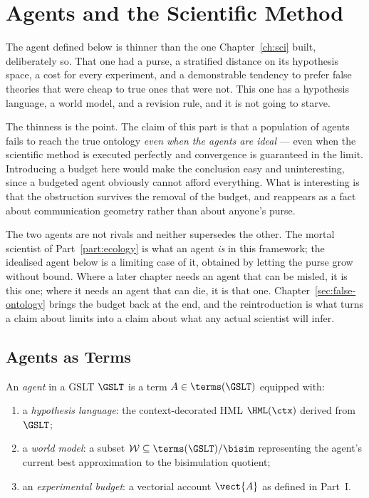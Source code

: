 \chapter{Agents and the Scientific Method}
\label{sec:agents}

The agent defined below is thinner than the one
Chapter~\ref{ch:sci} built, deliberately so.
That one had a purse, a stratified distance on its hypothesis space, a
cost for every experiment, and a demonstrable tendency to prefer false
theories that were cheap to true ones that were not.
This one has a hypothesis language, a world model, and a revision rule,
and it is not going to starve.

The thinness is the point.
The claim of this part is that a population of agents fails to reach the
true ontology \emph{even when the agents are ideal} --- even when the
scientific method is executed perfectly and convergence is guaranteed in
the limit.
Introducing a budget here would make the conclusion easy and
uninteresting, since a budgeted agent obviously cannot afford everything.
What is interesting is that the obstruction survives the removal of the
budget, and reappears as a fact about communication geometry rather than
about anyone's purse.

\begin{remark}
\label{rmk:two-agents}
The two agents are not rivals and neither supersedes the other.
The mortal scientist of Part~\ref{part:ecology} is what an agent
\emph{is} in this framework; the idealised agent below is a limiting case
of it, obtained by letting the purse grow without bound.
Where a later chapter needs an agent that can be misled, it is this one;
where it needs an agent that can die, it is that one.
Chapter~\ref{sec:false-ontology} brings the budget back at the end, and
the reintroduction is what turns a claim about limits into a claim about
what any actual scientist will infer.
\end{remark}

\bigskip

\section{Agents as Terms}

\begin{definition}[Agent]
An \emph{agent} in a GSLT $\GSLT$ is a term $A \in \terms(\GSLT)$
equipped with:
\begin{enumerate}[label=(\roman*)]
  \item a \emph{hypothesis language}: the context-decorated
        HML $\HML(\ctx)$ derived from $\GSLT$;
  \item a \emph{world model}: a subset $\mathcal{W} \subseteq
        \terms(\GSLT)/{\bisim}$ representing the agent's current
        best approximation to the bisimulation quotient;
  \item an \emph{experimental budget}: a vectorial account
        $\vect{A}$ as defined in Part~I.
\end{enumerate}
\end{definition}

